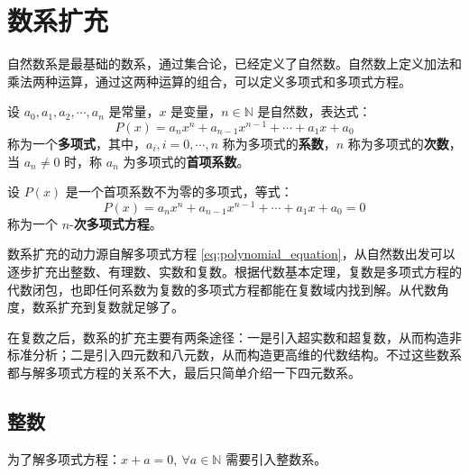 \chapter{数系扩充}

自然数系是最基础的数系，通过集合论，已经定义了自然数。自然数上定义加法和乘法两种运算，通过这两种运算的组合，可以定义多项式和多项式方程。

\begin{definition}
    设 $a_0,a_1,a_2,\cdots,a_n$ 是常量，$x$ 是变量，$n\in\mathbb{N}$ 是自然数，表达式：
    \[
        P(x) = a_n x^n + a_{n-1} x^{n-1} + \cdots + a_1 x + a_0
    \]
    称为一个\textbf{多项式}，其中，$a_i,i=0,\cdots,n$ 称为多项式的\textbf{系数}，$n$ 称为多项式的\textbf{次数}，当 $a_n \neq 0$ 时，称 $a_n$ 为多项式的\textbf{首项系数}。
    \label{def:polynomial_real}
\end{definition}

\begin{definition}
    设 $P(x)$ 是一个首项系数不为零的多项式，等式：
    \begin{equation}
        P(x) = a_n x^n + a_{n-1} x^{n-1} + \cdots + a_1 x + a_0 = 0
        \label{eq:polynomial_equation}
    \end{equation}
    称为一个 $n$-\textbf{次多项式方程}。
    \label{def:polynomial_equation_real}
\end{definition}

数系扩充的动力源自解多项式方程 \ref{eq:polynomial_equation}，从自然数出发可以逐步扩充出整数、有理数、实数和复数。根据代数基本定理，复数是多项式方程的代数闭包，也即任何系数为复数的多项式方程都能在复数域内找到解。从代数角度，数系扩充到复数就足够了。
\vspace{1em}

\begin{note}
    在复数之后，数系的扩充主要有两条途径：一是引入超实数和超复数，从而构造非标准分析；二是引入四元数和八元数，从而构造更高维的代数结构。不过这些数系都与解多项式方程的关系不大，最后只简单介绍一下四元数系。
\end{note}

\newpage

\section{整数}

为了解多项式方程：$x + a = 0,\ \forall a \in \mathbb{N}$ 需要引入整数系。

\newpage